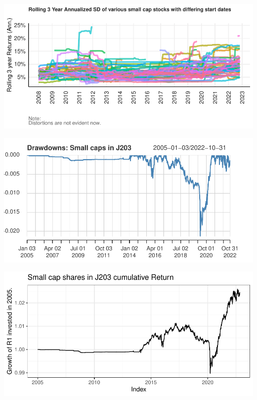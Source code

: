 \documentclass[11pt,preprint, authoryear]{elsarticle}
\let\origfigure\figure
\let\endorigfigure\endfigure
\renewenvironment{figure}[1][2] {
    \expandafter\origfigure\expandafter[H]
} {
    \endorigfigure
}
\numberwithin{equation}{section}
\numberwithin{figure}{section}
\numberwithin{table}{section}
\begin{document}
\begin{figure}[H]

{\centering \includegraphics{Volatility-of-Shares_files/figure-latex/Figure7-1} 

}

\caption{Caption Here \label{Figure7}}\label{fig:Figure7}
\end{figure}

\begin{figure}[H]

{\centering \includegraphics{Volatility-of-Shares_files/figure-latex/Figure8-1} 

}

\caption{Caption Here \label{Figure8}}\label{fig:Figure8}
\end{figure}

\begin{figure}[H]

{\centering \includegraphics{Volatility-of-Shares_files/figure-latex/Figure9-1} 

}

\caption{Caption Here \label{Figure9}}\label{fig:Figure9}
\end{figure}
\end{document}
